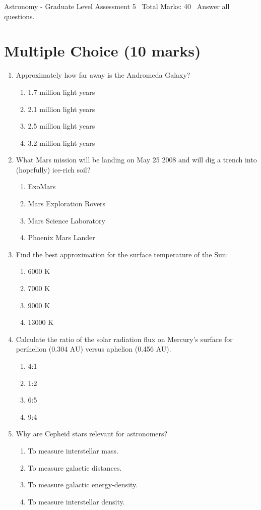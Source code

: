 \documentclass[12pt]{article}
\begin{document}
\begin{center}
Astronomy - Graduate Level Assessment 5 \
Total Marks: 40 \
Answer all questions.
\end{center}

\section*{Multiple Choice (10 marks)}
\begin{enumerate}[label=\arabic*.]
\item Approximately how far away is the Andromeda Galaxy?
\begin{enumerate}[label=(\alph*)]
    \item 1.7 million light years
    \item 2.1 million light years
    \item 2.5 million light years
    \item 3.2 million light years
\end{enumerate}
\item What Mars mission will be landing on May 25 2008 and will dig a trench into (hopefully)
ice-rich soil?
\begin{enumerate}[label=(\alph*)]
    \item ExoMars
    \item Mars Exploration Rovers
    \item Mars Science Laboratory
    \item Phoenix Mars Lander
\end{enumerate}
\item Find the best approximation for the surface temperature of the Sun:
\begin{enumerate}[label=(\alph*)]
    \item 6000 K
    \item 7000 K
    \item 9000 K
    \item 13000 K
\end{enumerate}
\item Calculate the ratio of the solar radiation flux on Mercury's surface for perihelion (0.304
AU) versus aphelion (0.456 AU).
\begin{enumerate}[label=(\alph*)]
    \item 4:1
    \item 1:2
    \item 6:5
    \item 9:4
\end{enumerate}
\item Why are Cepheid stars relevant for astronomers?
\begin{enumerate}[label=(\alph*)]
    \item To measure interstellar mass.
    \item To measure galactic distances.
    \item To measure galactic energy-density.
    \item To measure interstellar density.
\end{enumerate}
\end{enumerate}
\end{document}
